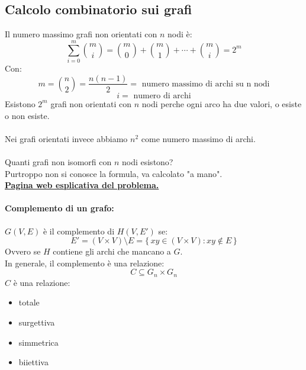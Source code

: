 \documentclass[a4paper,12pt]{article}
\begin{document}
\subsection{Calcolo combinatorio sui grafi}
Il numero massimo grafi non orientati con $n$ nodi è:
\[
\sum_{i=0}^{m} \binom{m}{i} = \binom{m}{0} + \binom{m}{1} + \cdots + \binom{m}{i} = 2^m
\]
Con:
\[
m = \binom{n}{2}  = \frac{n(n-1)}{2} = \text{ numero massimo di archi su n nodi}
\]
\[
i = \text{ numero di archi}
\]
Esistono $2^m$ grafi non orientati con $n$ nodi perche ogni arco ha due valori, o esiste o non esiste.\\\\
Nei grafi orientati invece abbiamo $n^2$ come numero massimo di archi.\\\\
Quanti grafi non isomorfi con $n$ nodi esistono?\\
Purtroppo non si conosce la formula, va calcolato "a mano".\\
\href{http://oeis.org/A001349}{\textbf{Pagina web esplicativa del problema.}}

\paragraph{Complemento di un grafo:} \( G(V, E) \) è il complemento di \( H(V, E') \) se:\\
\[
E' = (V \times V) \setminus E = \{\, xy \in (V \times V) : xy \notin E \,\}
\]
Ovvero se $H$ contiene gli archi che mancano a $G$.\\
In generale, il complemento è una relazione:
\[
C \subseteq G_n \times G_n
\]
$C$ è una relazione:
\begin{itemize}
    \item totale
    \item surgettiva
    \item simmetrica
    \item biiettiva
\end{itemize}
\end{document}
